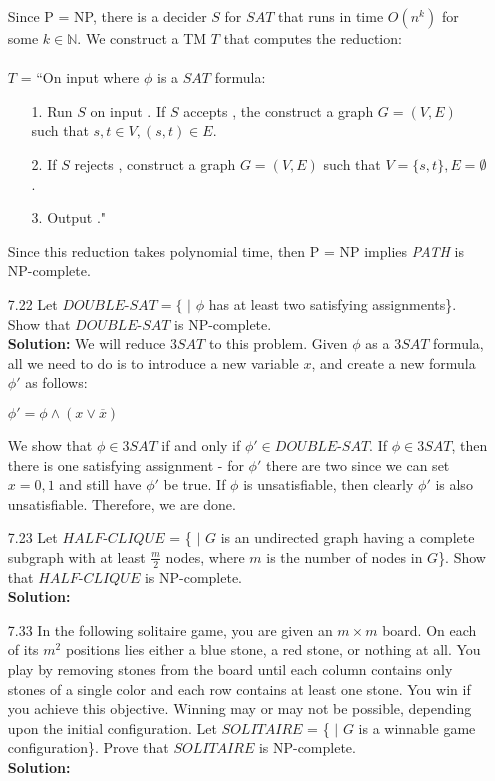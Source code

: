 \begin{enumerate}
\par Since P = NP, there is a decider $S$ for $SAT$ that runs in time $O(n^k)$ for some $k \in \mathbb{N}$. We construct a TM $T$ that computes the reduction:
\\ \\
$T$ = ``On input \angles{\phi} where $\phi$ is a $SAT$ formula:
\begin{enumerate}
\item[1.]Run $S$ on input \angles{\phi}. If $S$ accepts \angles{\phi}, the construct a graph $G = (V, E)$ such that $s, t \in V, (s, t) \in E$.
\item[2.]If $S$ rejects \angles{\phi}, construct a graph $G = (V, E)$ such that $V = \{s, t\}, E = \emptyset$.
\item[3.]Output ."
\end{enumerate}
Since this reduction takes polynomial time, then P = NP implies \emph{PATH} is NP-complete.

\item[7.22]Let $DOUBLE$-$SAT = \{$\angles{\phi} $|$ $\phi$ has at least two satisfying assignments\}. Show that $DOUBLE$-$SAT$ is NP-complete.
\\
\textbf{Solution:} We will reduce $3SAT$ to this problem. Given $\phi$ as a $3SAT$ formula, all we need to do is to introduce a new variable $x$, and create a new formula $\phi'$ as follows:
\begin{center}
$\phi' = \phi \wedge (x \vee \overline{x})$
\end{center}
We show that $\phi \in 3SAT$ if and only if $\phi' \in DOUBLE$-$SAT$. If $\phi \in 3SAT$, then there is one satisfying assignment - for $\phi'$ there are two since we can set $x = 0, 1$ and still have $\phi'$ be true. If $\phi$ is unsatisfiable, then clearly $\phi'$ is also unsatisfiable. Therefore, we are done.

\item[7.23]Let $HALF$-$CLIQUE$ = \{ $|$ $G$ is an undirected graph having a complete subgraph with at least $\frac{m}{2}$ nodes, where $m$ is the number of nodes in $G$\}. Show that $HALF$-$CLIQUE$ is NP-complete.
\\
\textbf{Solution:} \alreadyanswered

\item[7.33]In the following solitaire game, you are given an $m \times m$ board. On each of its $m^2$ positions lies either a blue stone, a red stone, or nothing at all. You play by removing stones from the board until each column contains only stones of a single color and each row contains at least one stone. You win if you achieve this objective. Winning may or may not be possible, depending upon the initial configuration. Let $SOLITAIRE$ = \{ $|$ $G$ is a winnable game configuration\}. Prove that $SOLITAIRE$ is NP-complete.
\\
\textbf{Solution:} \alreadyanswered


\end{enumerate}
